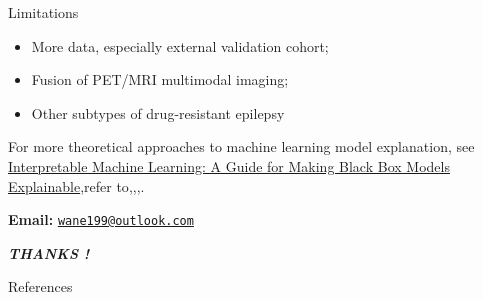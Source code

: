 \documentclass[
  10pt,
  ignorenonframetext,
  fontset=fandol]{beamer}
\newif\ifbibliography
\begin{document}
\begin{frame}{Limitations}
\protect\hypertarget{limitations}{}
\begin{itemize}[<+->]
\item More data, especially external validation cohort;
\bigskip
\item Fusion of PET/MRI multimodal imaging;
\bigskip
\item Other subtypes of drug-resistant epilepsy
\end{itemize}
\end{frame}

\begin{frame}{}
\protect\hypertarget{section}{}
For more theoretical approaches to machine learning model explanation,
see
\href{https://christophm.github.io/interpretable-ml-book/}{Interpretable
Machine Learning: A Guide for Making Black Box Models Explainable},refer
to\citep{beghi2019global},\citep{rajpurkar2021deep},\citep{mlr3book},\citep{molnar2022}.

\bigskip

\textbf{Email:}
\href{mailto:wane199@outlook.com}{\nolinkurl{wane199@outlook.com}}
\end{frame}

\begin{frame}{}
\protect\hypertarget{section-1}{}
\begin{center}
  \emph{\textbf{\Huge{{THANKS !}}}}
\end{center}
%
%
\end{frame}

\renewcommand\refname{References}
\begin{frame}[allowframebreaks]{References}
  \bibliographytrue
  
\end{frame}
\end{document}
